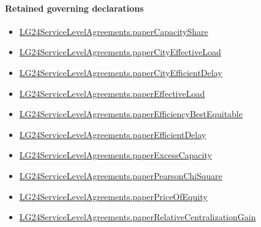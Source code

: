 \documentclass[10pt]{article}
\begin{document}
\paragraph{Retained governing declarations}
\begin{itemize}\raggedright
\item \hyperlink{governing-declaration-6d810744656fb451}{LG24\allowbreak{}Service\allowbreak{}Level\allowbreak{}Agreements.\allowbreak{}paper\allowbreak{}Capacity\allowbreak{}Share}
\item \hyperlink{governing-declaration-4b08fa8d929029a4}{LG24\allowbreak{}Service\allowbreak{}Level\allowbreak{}Agreements.\allowbreak{}paper\allowbreak{}City\allowbreak{}Effective\allowbreak{}Load}
\item \hyperlink{governing-declaration-453cff1a6b01907e}{LG24\allowbreak{}Service\allowbreak{}Level\allowbreak{}Agreements.\allowbreak{}paper\allowbreak{}City\allowbreak{}Efficient\allowbreak{}Delay}
\item \hyperlink{governing-declaration-f6f1c85dcb682371}{LG24\allowbreak{}Service\allowbreak{}Level\allowbreak{}Agreements.\allowbreak{}paper\allowbreak{}Effective\allowbreak{}Load}
\item \hyperlink{governing-declaration-e3687614c9582751}{LG24\allowbreak{}Service\allowbreak{}Level\allowbreak{}Agreements.\allowbreak{}paper\allowbreak{}Efficiency\allowbreak{}Best\allowbreak{}Equitable}
\item \hyperlink{governing-declaration-70a77d3cfca440a2}{LG24\allowbreak{}Service\allowbreak{}Level\allowbreak{}Agreements.\allowbreak{}paper\allowbreak{}Efficient\allowbreak{}Delay}
\item \hyperlink{governing-declaration-cfc6c9e8c89655cd}{LG24\allowbreak{}Service\allowbreak{}Level\allowbreak{}Agreements.\allowbreak{}paper\allowbreak{}Excess\allowbreak{}Capacity}
\item \hyperlink{governing-declaration-dd6b2af24ec4f24e}{LG24\allowbreak{}Service\allowbreak{}Level\allowbreak{}Agreements.\allowbreak{}paper\allowbreak{}Pearson\allowbreak{}Chi\allowbreak{}Square}
\item \hyperlink{governing-declaration-54aa3d28e4e76576}{LG24\allowbreak{}Service\allowbreak{}Level\allowbreak{}Agreements.\allowbreak{}paper\allowbreak{}Price\allowbreak{}Of\allowbreak{}Equity}
\item \hyperlink{governing-declaration-190b788157441ff2}{LG24\allowbreak{}Service\allowbreak{}Level\allowbreak{}Agreements.\allowbreak{}paper\allowbreak{}Relative\allowbreak{}Centralization\allowbreak{}Gain}
\end{itemize}
\end{document}
